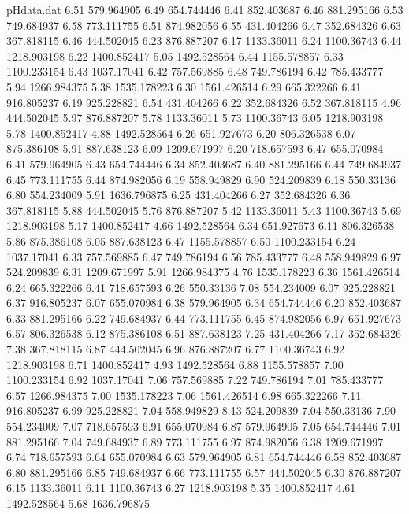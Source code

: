 \begin{filecontents}{pHdata.dat}
6.51 	579.964905
6.49 	654.744446
6.41 	852.403687
6.46 	881.295166
6.53 	749.684937
6.58 	773.111755
6.51 	874.982056
6.55 	431.404266
6.47 	352.684326
6.63 	367.818115
6.46 	444.502045
6.23 	876.887207
6.17 	1133.36011
6.24 	1100.36743
6.44 	1218.903198
6.22 	1400.852417
5.05 	1492.528564
6.44 	1155.578857
6.33 	1100.233154
6.43 	1037.17041
6.42 	757.569885
6.48 	749.786194
6.42 	785.433777
5.94 	1266.984375
5.38 	1535.178223
6.30 	1561.426514
6.29 	665.322266
6.41 	916.805237
6.19 	925.228821
6.54 	431.404266
6.22 	352.684326
6.52 	367.818115
4.96 	444.502045
5.97 	876.887207
5.78 	1133.36011
5.73 	1100.36743
6.05 	1218.903198
5.78 	1400.852417
4.88 	1492.528564
6.26 	651.927673
6.20 	806.326538
6.07 	875.386108
5.91 	887.638123
6.09 	1209.671997
6.20 	718.657593
6.47 	655.070984
6.41 	579.964905
6.43 	654.744446
6.34 	852.403687
6.40 	881.295166
6.44 	749.684937
6.45 	773.111755
6.44 	874.982056
6.19 	558.949829
6.90 	524.209839
6.18 	550.33136
6.80 	554.234009
5.91 	1636.796875
6.25 	431.404266
6.27 	352.684326
6.36 	367.818115
5.88 	444.502045
5.76 	876.887207
5.42 	1133.36011
5.43 	1100.36743
5.69 	1218.903198
5.17 	1400.852417
4.66 	1492.528564
6.34 	651.927673
6.11 	806.326538
5.86 	875.386108
6.05 	887.638123
6.47 	1155.578857
6.50 	1100.233154
6.24 	1037.17041
6.33 	757.569885
6.47 	749.786194
6.56 	785.433777
6.48 	558.949829
6.97 	524.209839
6.31 	1209.671997
5.91 	1266.984375
4.76 	1535.178223
6.36 	1561.426514
6.24 	665.322266
6.41 	718.657593
6.26 	550.33136
7.08 	554.234009
6.07 	925.228821
6.37 	916.805237
6.07 	655.070984
6.38 	579.964905
6.34 	654.744446
6.20 	852.403687
6.33 	881.295166
6.22 	749.684937
6.44 	773.111755
6.45 	874.982056
6.97 	651.927673
6.57 	806.326538
6.12 	875.386108
6.51 	887.638123
7.25 	431.404266
7.17 	352.684326
7.38 	367.818115
6.87 	444.502045
6.96 	876.887207
6.77 	1100.36743
6.92 	1218.903198
6.71 	1400.852417
4.93 	1492.528564
6.88 	1155.578857
7.00 	1100.233154
6.92 	1037.17041
7.06 	757.569885
7.22 	749.786194
7.01 	785.433777
6.57 	1266.984375
7.00 	1535.178223
7.06 	1561.426514
6.98 	665.322266
7.11 	916.805237
6.99 	925.228821
7.04 	558.949829
8.13 	524.209839
7.04 	550.33136
7.90 	554.234009
7.07 	718.657593
6.91 	655.070984
6.87 	579.964905
7.05 	654.744446
7.01 	881.295166
7.04 	749.684937
6.89 	773.111755
6.97 	874.982056
6.38 	1209.671997
6.74 	718.657593
6.64 	655.070984
6.63 	579.964905
6.81 	654.744446
6.58 	852.403687
6.80 	881.295166
6.85 	749.684937
6.66 	773.111755
6.57 	444.502045
6.30 	876.887207
6.15 	1133.36011
6.11 	1100.36743
6.27 	1218.903198
5.35 	1400.852417
4.61 	1492.528564
5.68 	1636.796875

\end{filecontents}
